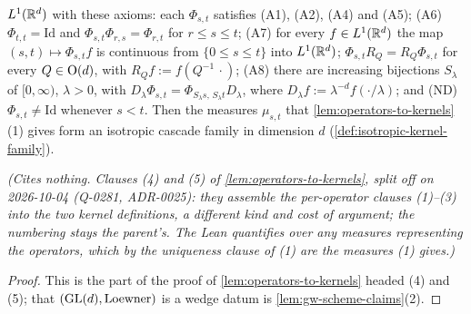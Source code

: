 \begin{lemma}
\begin{enumerate}
$L^1(\mathbb{R}^d)$ with these axioms: each $\Phi_{s,t}$ satisfies (A1),
(A2), (A4) and (A5); (A6) $\Phi_{t,t} = \mathrm{Id}$ and $\Phi_{s,t}\Phi_{r,s} = \Phi_{r,t}$ for
$r \le s \le t$; (A7) for every $f \in L^1(\mathbb{R}^d)$ the map $(s,t) \mapsto \Phi_{s,t}f$ is
continuous from $\{0 \le s \le t\}$ into $L^1(\mathbb{R}^d)$; $\Phi_{s,t}R_Q = R_Q\Phi_{s,t}$ for every
$Q \in \mathrm{O}(d)$, with $R_Qf := f(Q^{-1}\,\cdot)$; (A8) there are increasing bijections
$S_\lambda$ of $[0,\infty)$, $\lambda > 0$, with
$D_\lambda\Phi_{s,t} = \Phi_{S_\lambda s,\,S_\lambda t}D_\lambda$, where
$D_\lambda f := \lambda^{-d}f(\cdot/\lambda)$; and (ND) $\Phi_{s,t} \ne \mathrm{Id}$ whenever
$s < t$. Then the measures $\mu_{s,t}$ that \ref{lem:operators-to-kernels}(1) gives form an
isotropic cascade family in dimension $d$ (\ref{def:isotropic-kernel-family}).
\end{enumerate}
\statusT\quad\emph{(Cites nothing. Clauses (4) and (5) of \ref{lem:operators-to-kernels}, split off
on 2026-10-04 (Q-0281, ADR-0025): they assemble the per-operator clauses (1)--(3) into the two
kernel definitions, a different kind and cost of argument; the numbering stays the parent's. The Lean
quantifies over any measures representing the operators, which by the uniqueness clause of (1) are
the measures (1) gives.)}
\end{lemma}

\begin{proof}
\leanok
This is the part of the proof of \ref{lem:operators-to-kernels} headed (4) and (5); that $(\mathrm{GL}(d),
\text{Loewner})$ is a wedge datum is \ref{lem:gw-scheme-claims}(2).
\end{proof}

